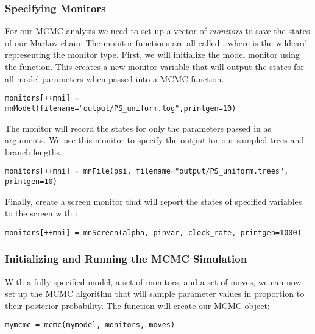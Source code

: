 \subsubsection{Specifying Monitors}

For our MCMC analysis we need to set up a vector of \textit{monitors} to save the states of our Markov chain. 
The monitor functions are all called , where \cl{*} is the wildcard representing the monitor type.
First, we will initialize the model monitor using the  function. This creates a new monitor variable that will output the states for all model parameters when passed into a MCMC function. 
{\tt \begin{snugshade*}
\begin{lstlisting}
monitors[++mni] = mnModel(filename="output/PS_uniform.log",printgen=10)
\end{lstlisting}
\end{snugshade*}}

The  monitor will record the states for only the parameters passed in as arguments. We use this monitor to specify the output for our sampled trees and branch lengths.

{\tt \begin{snugshade*}
\begin{lstlisting}
monitors[++mni] = mnFile(psi, filename="output/PS_uniform.trees", printgen=10)
\end{lstlisting}
\end{snugshade*}}

Finally, create a screen monitor that will report the states of specified variables to the screen with :
{\tt \begin{snugshade*}
\begin{lstlisting}
monitors[++mni] = mnScreen(alpha, pinvar, clock_rate, printgen=1000)
\end{lstlisting}
\end{snugshade*}}


\subsubsection{Initializing and Running the MCMC Simulation}

With a fully specified model, a set of monitors, and a set of moves, we can now set up the MCMC algorithm that will sample parameter values in proportion to their posterior probability. The  function will create our MCMC object:
{\tt \begin{snugshade*}
\begin{lstlisting}
mymcmc = mcmc(mymodel, monitors, moves)
\end{lstlisting}
\end{snugshade*}}

